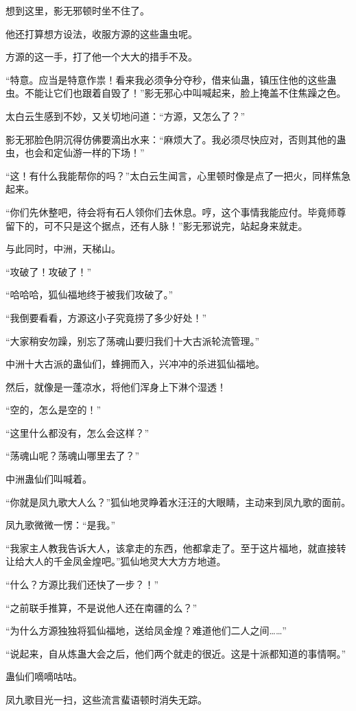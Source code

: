 \begin{this_body}
想到这里，影无邪顿时坐不住了。

他还打算想方设法，收服方源的这些蛊虫呢。

方源的这一手，打了他一个大大的措手不及。

“特意。应当是特意作祟！看来我必须争分夺秒，借来仙蛊，镇压住他的这些蛊虫。不能让它们也跟着自毁了！”影无邪心中叫喊起来，脸上掩盖不住焦躁之色。

太白云生感到不妙，又关切地问道：“方源，又怎么了？”

影无邪脸色阴沉得仿佛要滴出水来：“麻烦大了。我必须尽快应对，否则其他的蛊虫，也会和定仙游一样的下场！”

“这！有什么我能帮你的吗？”太白云生闻言，心里顿时像是点了一把火，同样焦急起来。

“你们先休整吧，待会将有石人领你们去休息。哼，这个事情我能应付。毕竟师尊留下的，可不只是这个据点，还有人脉！”影无邪说完，站起身来就走。

与此同时，中洲，天梯山。

“攻破了！攻破了！”

“哈哈哈，狐仙福地终于被我们攻破了。”

“我倒要看看，方源这小子究竟捞了多少好处！”

“大家稍安勿躁，别忘了荡魂山要归我们十大古派轮流管理。”

中洲十大古派的蛊仙们，蜂拥而入，兴冲冲的杀进狐仙福地。

然后，就像是一蓬凉水，将他们浑身上下淋个湿透！

“空的，怎么是空的！”

“这里什么都没有，怎么会这样？”

“荡魂山呢？荡魂山哪里去了？”

中洲蛊仙们叫喊着。

“你就是凤九歌大人么？”狐仙地灵睁着水汪汪的大眼睛，主动来到凤九歌的面前。

凤九歌微微一愣：“是我。”

“我家主人教我告诉大人，该拿走的东西，他都拿走了。至于这片福地，就直接转让给大人的千金凤金煌吧。”狐仙地灵大大方方地道。

“什么？方源比我们还快了一步？！”

“之前联手推算，不是说他人还在南疆的么？”

“为什么方源独独将狐仙福地，送给凤金煌？难道他们二人之间……”

“说起来，自从炼蛊大会之后，他们两个就走的很近。这是十派都知道的事情啊。”

蛊仙们嘀嘀咕咕。

凤九歌目光一扫，这些流言蜚语顿时消失无踪。

\end{this_body}

